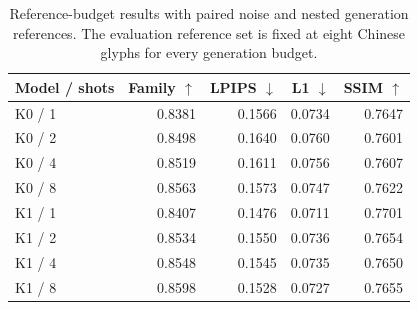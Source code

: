 \begin{table}[t]
\centering\small
\caption{Reference-budget results with paired noise and nested generation references. The evaluation reference set is fixed at eight Chinese glyphs for every generation budget.}
\begin{tabular}{lrrrr}
\toprule
Model / shots & Family $\uparrow$ & LPIPS $\downarrow$ & L1 $\downarrow$ & SSIM $\uparrow$ \\
\midrule
K0 / 1 & 0.8381 & 0.1566 & 0.0734 & 0.7647 \\
K0 / 2 & 0.8498 & 0.1640 & 0.0760 & 0.7601 \\
K0 / 4 & 0.8519 & 0.1611 & 0.0756 & 0.7607 \\
K0 / 8 & 0.8563 & 0.1573 & 0.0747 & 0.7622 \\
K1 / 1 & 0.8407 & 0.1476 & 0.0711 & 0.7701 \\
K1 / 2 & 0.8534 & 0.1550 & 0.0736 & 0.7654 \\
K1 / 4 & 0.8548 & 0.1545 & 0.0735 & 0.7650 \\
K1 / 8 & 0.8598 & 0.1528 & 0.0727 & 0.7655 \\
\bottomrule
\end{tabular}
\end{table}
